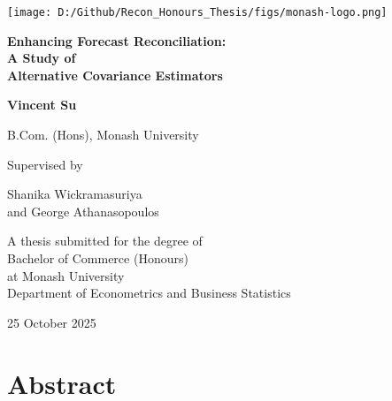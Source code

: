 \documentclass[
  11pt,
  letterpaper,
  DIV=11,
  numbers=noendperiod,
  titlepage]{scrartcl}
\author{}
\date{}
\begin{document}
\begin{titlepage}

\begin{center}
\texttt{[image: D:/Github/Recon\_Honours\_Thesis/figs/monash-logo.png]}
\end{center}

\centering

{%
\sffamily

\vspace*{1.5cm}

{\huge \bfseries Enhancing Forecast Reconciliation:\\
A Study of\\
Alternative Covariance Estimators\par}

\vspace{2cm}

{\Large \bfseries Vincent Su\par}
{\large B.Com. (Hons), Monash University\par}

\vspace{1cm}

{\large Supervised by\par}
{\Large Shanika Wickramasuriya\\
and George Athanasopoulos\par}

\vfill

{\large A thesis submitted for the degree of \\
Bachelor of Commerce (Honours)\\
at Monash University\\
Department of Econometrics and Business Statistics\par}

\vspace{0.3cm}

{\large 25 October 2025\par}

}%
\end{titlepage}

\pagebreak

\section*{Abstract}\label{abstract}
\end{document}
